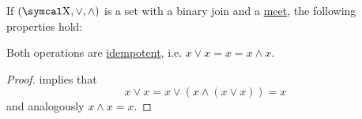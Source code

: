 \begin{proposition}\label{thm:binary_lattice_operations_properties}
  If \( (\CX, \vee, \wedge) \) is a set with a binary join and a \hyperref[def:binary_lattice_operations]{meet}, the following properties hold:
  \begin{DefEnum}
     Both operations are \hyperref[def:algebraic_theory/idempotent_element]{idempotent}, i.e. \( x \vee x = x = x \wedge x \).
  \end{DefEnum}
\end{proposition}
\begin{proof}
    implies that
  \begin{equation*}
    x \vee x = x \vee (x \wedge (x \vee x)) = x
  \end{equation*}
  and analogously \( x \wedge x = x \).
\end{proof}

